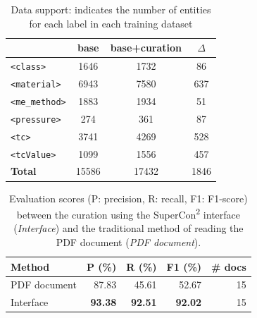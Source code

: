 \documentclass[]{interact}
\theoremstyle{plain} %
\theoremstyle{definition}
\theoremstyle{remark}
\begin{document}
\begin{table}[ht]
\centering
\small
\caption{Data support: indicates the number of entities for each label in each training dataset}
\begin{tabular}{lccc}
\toprule
                        & \textbf{base}     & \textbf{base+curation}    & \textbf{$\Delta$}  \\ 
\midrule
\texttt{<class>}        & 1646              & 1732                      &  86                \\
\texttt{<material>}     & 6943              & 7580                      &  637               \\
\texttt{<me\_method>}   & 1883              & 1934                      &  51                \\
\texttt{<pressure>}     & 274               & 361                       &  87                \\
\texttt{<tc>}           & 3741              & 4269                      &  528               \\
\texttt{<tcValue>}      & 1099              & 1556                      &  457               \\
\midrule
\textbf{Total}          & 15586             & 17432                     & 1846               \\ 
\bottomrule
\end{tabular}
\label{tab:training-support}
\end{table}


\begin{table}[ht]
\centering\small
\caption{Evaluation scores (P: precision, R: recall, F1: F1-score) between the curation using the SuperCon\textsuperscript{2} interface (\textit{Interface}) and the traditional method of reading the PDF document (\textit{PDF document}). }
\begin{tabular}{lrrrr}
\toprule
    \textbf{Method}    & \textbf{P (\%)}   & \textbf{R (\%)}   & \textbf{F1 (\%)}  & \textbf{\# docs}   \\
    \midrule
    PDF document    & 87.83             & 45.61             & 52.67             & 15        \\
    Interface       & \textbf{93.38}    & \textbf{92.51}    & \textbf{92.02}    & 15        \\
    \bottomrule
\end{tabular}
\label{tab:evaluation-interface-correction}
\end{table}
\end{document}
